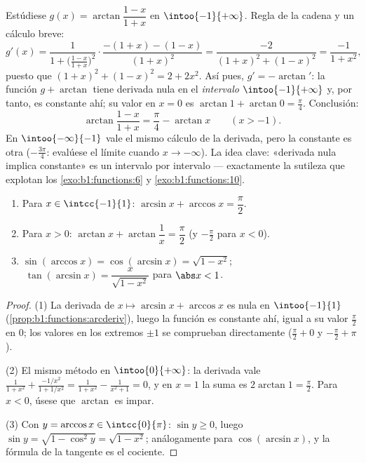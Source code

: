 \begin{example}\label{ex:b1:functions:hiddenconst}
Estúdiese $g(x) = \arctan\dfrac{1 - x}{1 + x}$ en
$\intoo{-1}{+\infty}$. Regla de la cadena y un cálculo breve:
\[
g'(x) = \frac{1}{1 + \bigl(\frac{1-x}{1+x}\bigr)^2}\cdot
\frac{-(1+x) - (1-x)}{(1+x)^2}
= \frac{-2}{(1+x)^2 + (1-x)^2}
= \frac{-1}{1 + x^2} ,
\]
puesto que $(1+x)^2 + (1-x)^2 = 2 + 2x^2$. Así pues, $g' = -\arctan'$:
la función $g + \arctan$ tiene derivada nula en el \emph{intervalo}
$\intoo{-1}{+\infty}$ y, por tanto, es constante ahí; su valor en
$x = 0$ es $\arctan 1 + \arctan 0 = \frac\pi4$. Conclusión:
\[
\arctan\frac{1 - x}{1 + x} = \frac\pi4 - \arctan x
\qquad (x > -1) .
\]
En $\intoo{-\infty}{-1}$ vale el mismo cálculo de la derivada, pero la
constante es otra ($-\frac{3\pi}4$: evalúese el límite cuando
$x \to -\infty$). La idea clave: «derivada nula implica constante» es
un  intervalo por intervalo --- exactamente la sutileza que
explotan los \cref{exo:b1:functions:6} y \cref{exo:b1:functions:10}.
\end{example}

\begin{proposition}\label{prop:b1:functions:arcidentities}
\begin{enumerate}
  \item Para $x \in \intcc{-1}{1}$: $\arcsin x + \arccos x =
        \dfrac{\pi}{2}$.
  \item Para $x > 0$: $\arctan x + \arctan\dfrac 1x = \dfrac{\pi}{2}$
        (y $-\frac\pi2$ para $x < 0$).
  \item $\sin(\arccos x) = \cos(\arcsin x) = \sqrt{1 - x^2}$;
        $\;\tan(\arcsin x) = \dfrac{x}{\sqrt{1 - x^2}}$ para
        $\abs x < 1$.
\end{enumerate}
\end{proposition}

\begin{proof}
(1) La derivada de $x \mapsto \arcsin x + \arccos x$ es nula en
$\intoo{-1}{1}$ (\cref{prop:b1:functions:arcderiv}), luego la función
es constante ahí, igual a su valor $\frac\pi2$ en $0$; los valores en
los extremos $\pm 1$ se comprueban directamente ($\frac\pi2 + 0$ y
$-\frac\pi2 + \pi$).

(2) El mismo método en $\intoo{0}{+\infty}$: la derivada vale
$\frac{1}{1+x^2} + \frac{-1/x^2}{1 + 1/x^2} = \frac{1}{1+x^2} -
\frac{1}{x^2 + 1} = 0$, y en $x = 1$ la suma es $2\arctan 1 =
\frac\pi2$. Para $x < 0$, úsese que $\arctan$ es impar.

(3) Con $y = \arccos x \in \intcc{0}{\pi}$: $\sin y \geq 0$, luego
$\sin y = \sqrt{1 - \cos^2 y} = \sqrt{1 - x^2}$; análogamente para
$\cos(\arcsin x)$, y la fórmula de la tangente es el cociente.
\end{proof}

